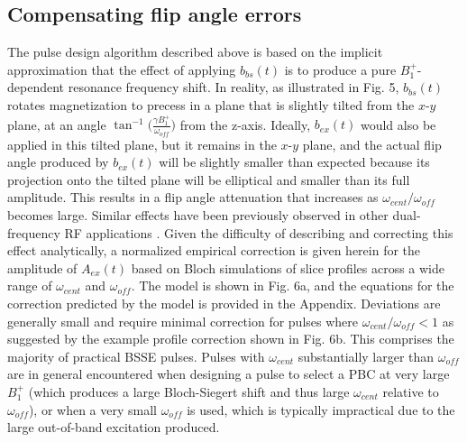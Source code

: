 \documentclass[a4paper,12pt]{article}
\newcommand{\bext}{b_{ex}(t)}
\newcommand{\bbst}{b_{bs}(t)}
\begin{document}
\subsection*{Compensating flip angle errors}
The pulse design algorithm described above is based on the implicit approximation
that the effect of applying $\bbst$ is to produce a pure $B_1^+$-dependent 
resonance frequency shift.
In reality, as illustrated in Fig. 5, 
$\bbst$ rotates magnetization to precess in a plane that is slightly tilted from 
the $x$-$y$ plane, 
at an angle $\tan^{-1}\Big(\frac{\gamma B_1^+}{\omega_{off}}\Big)$ from the z-axis. 
Ideally, $\bext$ would also be applied in this tilted plane,
but it remains in the $x$-$y$ plane,
and the actual flip angle produced by $\bext$ will be slightly smaller than expected
because its projection onto the tilted plane will be elliptical and smaller than its full amplitude.
This results in a flip angle attenuation that increases as $\omega_{cent}/\omega_{off}$ becomes large.
Similar effects have been previously observed in other dual-frequency RF applications \cite{Mccoy1993SelectiveDecoupling, Steffen2000}.
Given the difficulty of describing and correcting this effect analytically, a
normalized empirical correction is given herein for the amplitude of $A_{ex}(t)$ based on Bloch simulations of slice profiles across a wide range of $\omega_{cent}$ and $\omega_{off}$. 
The model is shown in Fig. 6a, 
and the equations for the correction predicted by the model is provided in the Appendix. 
Deviations are generally small and require minimal correction for pulses where 
$\omega_{cent}/ \omega_{off} < 1$ as suggested by the example profile correction shown in Fig. 6b. This comprises the majority of practical BSSE pulses. 
Pulses with $\omega_{cent}$ substantially larger than $\omega_{off}$ are in general encountered when designing a pulse to select a PBC at very large $B_1^+$ (which produces a large Bloch-Siegert shift and thus large $\omega_{cent}$ relative to $\omega_{off}$), or when a very small $\omega_{off}$ is used, which is typically impractical due to the large out-of-band excitation produced.
\end{document}
